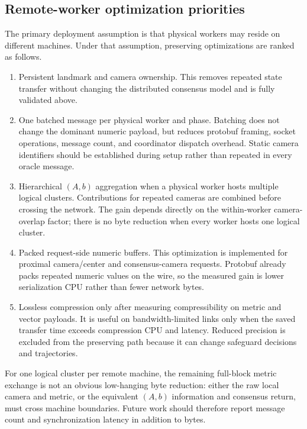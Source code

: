 \subsection{Remote-worker optimization priorities}

The primary deployment assumption is that physical workers may reside on
different machines.  Under that assumption, preserving optimizations are ranked
as follows.
\begin{enumerate}
  \item Persistent landmark and camera ownership.  This removes repeated state
    transfer without changing the distributed consensus model and is fully
    validated above.
  \item One batched message per physical worker and phase.  Batching does not
    change the dominant numeric payload, but reduces protobuf framing,
    socket operations, message count, and coordinator dispatch overhead.
    Static camera identifiers should be established during setup rather
    than repeated in every oracle message.
  \item Hierarchical $(A,b)$ aggregation when a physical worker hosts multiple
    logical clusters.  Contributions for repeated cameras are combined
    before crossing the network.  The gain depends directly on the
    within-worker camera-overlap factor; there is no byte reduction when
    every worker hosts one logical cluster.
    \item Packed request-side numeric buffers.  This optimization is implemented
      for proximal camera/center and consensus-camera requests.  Protobuf
      already packs repeated numeric values on the wire, so the measured gain
      is lower serialization CPU rather than fewer network bytes.
  \item Lossless compression only after measuring compressibility on metric and
    vector payloads.  It is useful on bandwidth-limited links only when the
    saved transfer time exceeds compression CPU and latency.  Reduced
    precision is excluded from the preserving path because it can change
    safeguard decisions and trajectories.
\end{enumerate}
For one logical cluster per remote machine, the remaining full-block metric
exchange is not an obvious low-hanging byte reduction: either the raw local
camera and metric, or the equivalent $(A,b)$ information and consensus return,
must cross machine boundaries.  Future work should therefore report message
count and synchronization latency in addition to bytes.

